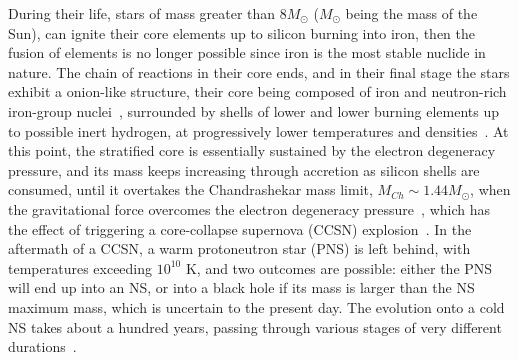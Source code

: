 During their life, stars of mass greater than $8M_\odot$ ($M_\odot$ being the
mass of the Sun), can ignite their core elements up to silicon burning into 
iron, then the fusion of elements is 
no longer possible since iron is the most stable nuclide in nature. 
The chain of reactions in their core ends, and in their final stage the stars 
exhibit a onion-like structure, their core being composed of iron and 
neutron-rich iron-group nuclei~\cite{Bethe1979}, surrounded by shells of lower 
and lower burning elements up to possible inert hydrogen, at progressively 
lower temperatures and densities~\cite{Woosley2002}. 
At this point, the stratified core is essentially sustained by the electron
degeneracy pressure, and its mass keeps increasing through accretion as silicon 
shells are consumed, until it overtakes the Chandrashekar mass limit, $M_{Ch}
\sim 1.44M_\odot$, when the gravitational force overcomes the electron 
degeneracy pressure~\cite{Chandrasekhar1931}, which has the effect of 
triggering a core-collapse supernova (CCSN) explosion~\cite{Janka2007}.
In the aftermath of a CCSN, a warm protoneutron star (PNS) is left behind, with
temperatures exceeding $10^{10}$ K, and two outcomes are possible: either the 
PNS will end up into an NS, or into a black hole if its mass is larger 
than the NS maximum mass, which is uncertain to the present day. 
The evolution onto a cold NS takes about a hundred years, passing through 
various stages of very different durations~\cite{Prakash1997}. 
 
